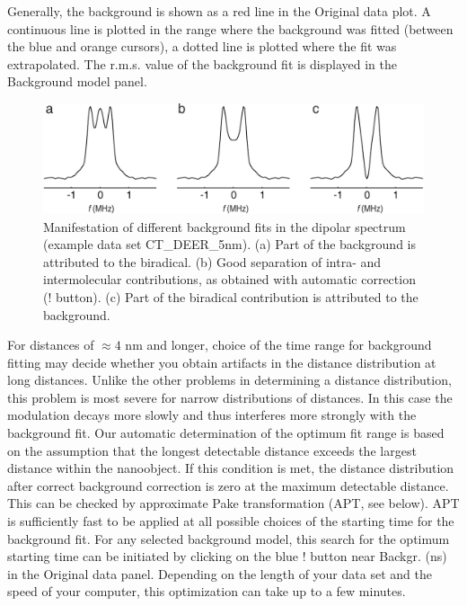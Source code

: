 \documentclass{article}
\begin{document}
Generally, the background is shown as a red line in the {\ttfamily Original data} plot. A continuous line is plotted in the range where the background was fitted (between the blue and orange cursors), a dotted line is plotted where the fit was extrapolated. The r.m.s. value of the background fit is displayed in the {\ttfamily Background model} panel.

\begin{figure}[ht]
 	\begin{center}
  \includegraphics[width=1.0\textwidth]{fig5.pdf}
	\end{center}
	\caption{Manifestation of different background fits in the dipolar spectrum
(example data set CT\_DEER\_5nm). (a) Part of the background is attributed to
the biradical. (b) Good separation of intra- and intermolecular contributions,
as obtained with automatic correction ({\ttfamily !} button). (c) Part of the biradical
contribution is attributed to the background.}
	\label{fig:manfig5}
\end{figure}

For distances of $\approx4$ nm and longer, choice of the time range for background
fitting may decide whether you obtain artifacts in the distance distribution at
long distances. Unlike the other problems in determining a distance distribution,
this problem is most severe for narrow distributions of distances. In this case the
modulation decays more slowly and thus interferes more strongly with the background
fit. Our automatic determination of the optimum fit range is based on
the assumption that the longest detectable distance exceeds the largest distance
within the nanoobject. If this condition is met, the distance distribution after
correct background correction is zero at the maximum detectable distance. This
can be checked by approximate Pake transformation (APT, see below). APT is
sufficiently fast to be applied at all possible choices of the starting time for the
background fit. For any selected background model, this search for the optimum
starting time can be initiated by clicking on the blue {\ttfamily !} button near {\ttfamily Backgr. (ns)} in
the {\ttfamily Original data} panel. Depending on the length of your data set and the
speed of your computer, this optimization can take up to a few minutes.
\end{document}
